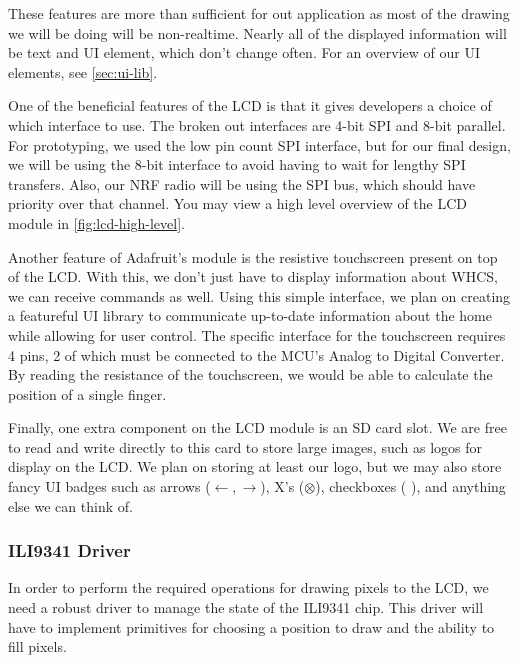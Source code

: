These features are more than sufficient for out application as most of the
drawing we will be doing will be non-realtime. Nearly all of the displayed
information will be text and UI element, which don't change often. For an
overview of our UI elements, see \autoref{sec:ui-lib}.

One of the beneficial features of the LCD is that it gives developers a choice
of which interface to use. The broken out interfaces are 4-bit SPI and 8-bit
parallel. For prototyping, we used the low pin count SPI interface, but for our
final design, we will be using the 8-bit interface to avoid having to wait for
lengthy SPI transfers. Also, our NRF radio will be using the SPI bus, which
should have priority over that channel. You may view a high level overview of
the LCD module in \autoref{fig:lcd-high-level}.


Another feature of Adafruit's module is the resistive touchscreen present on top of the
LCD. With this, we don't just have to display information about WHCS, we can
receive commands as well. Using this simple interface, we plan on creating a
featureful UI library to communicate up-to-date information about the home
while allowing for user control. The specific interface for the touchscreen
requires 4 pins, 2 of which must be connected to the MCU's Analog to Digital
Converter. By reading the resistance of the touchscreen, we would be able to
calculate the position of a single finger.

Finally, one extra component on the LCD module is an SD card slot. We are free
to read and write directly to this card to store large images, such as logos
for display on the LCD. We plan on storing at least our logo, but we may also
store fancy UI badges such as arrows ($\leftarrow,\rightarrow$), X's
($\otimes$), checkboxes (
\makebox[0pt][l]{$\square$}\raisebox{.15ex}{\hspace{0.1em}$\checkmark$}), and
anything else we can think of.

\subsubsection{ILI9341 Driver}
\label{sec:lcd-driver}

In order to perform the required operations for drawing pixels to the LCD, we
need a robust driver to manage the state of the ILI9341 chip. This driver will
have to implement primitives for choosing a position to draw and the ability to fill
pixels.

